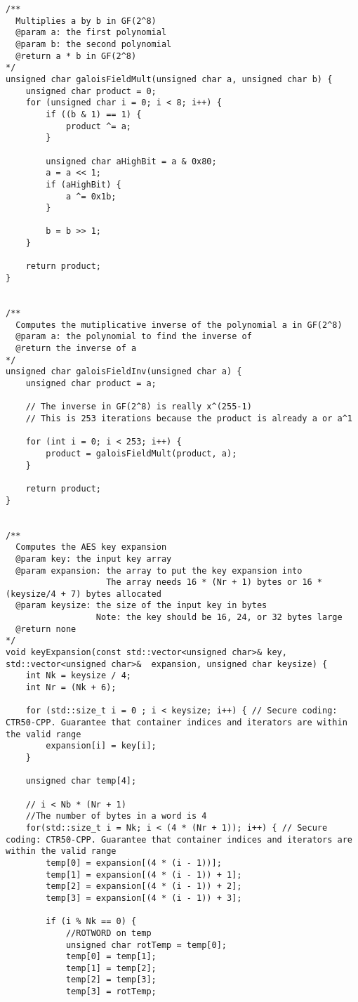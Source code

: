 \documentclass[a4paper,12pt]{article}
\begin{document}
{\begin{lstlisting}
/**
  Multiplies a by b in GF(2^8) 
  @param a: the first polynomial
  @param b: the second polynomial
  @return a * b in GF(2^8)
*/
unsigned char galoisFieldMult(unsigned char a, unsigned char b) {
	unsigned char product = 0;
	for (unsigned char i = 0; i < 8; i++) {
		if ((b & 1) == 1) {
			product ^= a;
		}

		unsigned char aHighBit = a & 0x80;
		a = a << 1;
		if (aHighBit) {
			a ^= 0x1b;
		}

		b = b >> 1;
	}

	return product;
}


/**
  Computes the mutiplicative inverse of the polynomial a in GF(2^8)
  @param a: the polynomial to find the inverse of
  @return the inverse of a
*/
unsigned char galoisFieldInv(unsigned char a) {
	unsigned char product = a;

	// The inverse in GF(2^8) is really x^(255-1)
	// This is 253 iterations because the product is already a or a^1

	for (int i = 0; i < 253; i++) {
		product = galoisFieldMult(product, a);
	}

	return product;
}


/**
  Computes the AES key expansion
  @param key: the input key array
  @param expansion: the array to put the key expansion into
                    The array needs 16 * (Nr + 1) bytes or 16 * (keysize/4 + 7) bytes allocated
  @param keysize: the size of the input key in bytes
  				  Note: the key should be 16, 24, or 32 bytes large
  @return none
*/
void keyExpansion(const std::vector<unsigned char>& key, std::vector<unsigned char>&  expansion, unsigned char keysize) {
	int Nk = keysize / 4;
	int Nr = (Nk + 6);

	for (std::size_t i = 0 ; i < keysize; i++) { // Secure coding: CTR50-CPP. Guarantee that container indices and iterators are within the valid range
		expansion[i] = key[i];
	}

	unsigned char temp[4];

	// i < Nb * (Nr + 1)
	//The number of bytes in a word is 4
	for(std::size_t i = Nk; i < (4 * (Nr + 1)); i++) { // Secure coding: CTR50-CPP. Guarantee that container indices and iterators are within the valid range
		temp[0] = expansion[(4 * (i - 1))];
		temp[1] = expansion[(4 * (i - 1)) + 1];
		temp[2] = expansion[(4 * (i - 1)) + 2];
		temp[3] = expansion[(4 * (i - 1)) + 3];

		if (i % Nk == 0) {
			//ROTWORD on temp
			unsigned char rotTemp = temp[0];
			temp[0] = temp[1];
			temp[1] = temp[2];
			temp[2] = temp[3];
			temp[3] = rotTemp;


\end{lstlisting}}
\end{document}
